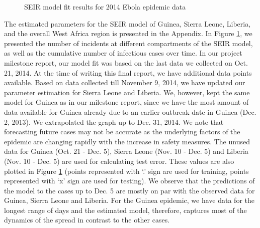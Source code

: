 \documentclass[10pt, journal,onecolumn]{IEEEtran}
\begin{document}
\begin{figure}[ht]
\quad
{}

\caption{SEIR model fit results for 2014 Ebola epidemic data}
\label{Fig:figurePrediction}
\end{figure}


The estimated parameters for the SEIR model of Guinea, Sierra Leone, Liberia, and the overall West Africa 
region is presented in the Appendix. In Figure \ref{Fig:figurePrediction}, we presented the number of incidents at different compartments of the SEIR model, as well as the cumulative number of infectious cases over time. In our project milestone report, our model fit was based on the last data we collected on Oct. 21, 2014. At the time of writing this final report, we have additional data points available. Based on data collected till November 9, 2014, we have updated our parameter estimation for Sierra Leone and Liberia. We, however, kept the same model for Guinea as in our milestone report, since we have the most amount of data available for Guinea already due to an earlier outbreak date in Guinea (Dec. 2, 2013). We extrapolated the graph up to Dec. 31, 2014.  We note that forecasting future cases may not be accurate as the underlying factors of the epidemic are changing rapidly with the increase in safety measures. The unused data for Guinea (Oct. 21 - Dec. 5), Sierra Leone (Nov. 10 - Dec. 5) and Liberia (Nov. 10 - Dec. 5) are used for calculating test error. These values are also plotted in Figure \ref{Fig:figurePrediction} (points represented with `.' sign are used for training, points represented with `x' sign are used for testing). We observe that the predictions of the model to the cases up to Dec. 5 are mostly on par with the observed data for Guinea, Sierra Leone and Liberia. For the Guinea epidemic, we have data for the longest range of days and the estimated model, therefore, captures most of the
dynamics of the spread in contrast to the other cases.  
\end{document}
